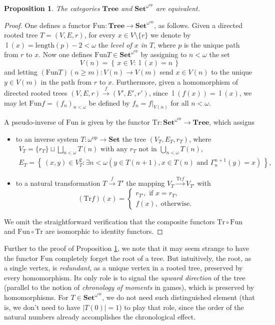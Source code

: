 \documentclass[12pt]{amsart}
\newtheorem{prop}[thm]{Proposition}
\theoremstyle{definition}
\newcommand{\set}[1]{\left\{\, {#1} \,\right\}}
\DeclareMathOperator{\level}{l}
\newcommand{\Sets}{\mathbf{Set}}
\newcommand{\Tree}{\mathbf{Tree}}
\newcommand{\SetNop}{\Sets^{\omega^{\op}}}
\newcommand{\op}{\mathrm{op}}
\begin{document}
\begin{prop}\label{THM_Tree_SetNop}
	The categories $\Tree$ and $\SetNop$ are equivalent.
\end{prop}
\begin{proof}
	One defines a functor $\mathrm{Fun}\colon \Tree \to \SetNop$, as follows. Given a directed rooted tree $T=(V,E,r)$, for every $x\in V\setminus\{r\}$ we denote by $\level(x) = \mathrm{length}(p)-2<\omega$ the \textit{level of $x$ in $T$}, where $p$ is the unique path from $r$ to $x$. 
	Now one defines $\mathrm{Fun}T\in \SetNop$  by assigning to $n<\omega$ the set
	\[		
	V(n) = \set{x\in V: \level(x)=n}
	\]
	and  letting $(\mathrm{Fun}T)(n\ge m)\colon V(n) \to V(m)$ send $x\in V(n)$ to the unique $y\in V(m)$ in the path from $r$ to $x$. 
	Furthermore, given a homomorphism of directed rooted trees $(V,E,r)\stackrel{f}{\to}(V',E',r')$, since $\level(f(x))=\level(x)$, we may let $\mathrm{Fun}f = (f_n)_{n<\omega}$ be defined by $f_n=f|_{V(n)}$ for all $n<\omega$.
	
	A pseudo-inverse of $\mathrm{Fun}$ is given by the functor
	$\mathrm{Tr}\colon \SetNop \to \Tree$, which assigns
	\begin{itemize}
		\item to an inverse system $T\colon \omega^{\op} \to \Sets$ the tree $(V_T,E_T,r_T)$, where 
		\begin{gather*}
			V_T=\{r_T\} \sqcup\bigsqcup_{n<\omega}T(n) \text{ with any } r_T \text{ not in } \bigcup_{n<\omega}T(n),\\  
			E_T=\set{(x,y)\in V_T^2: \exists n<\omega (y\in T(n+1),  x\in T(n) \text{ and } \Gamma^{n+1}_n(y)=x)},
		\end{gather*}
		\item to a natural transformation $T\stackrel{f}{\to} T'$ the mapping $V_T\stackrel{\mathrm{Tr}f}{\to} V_{T'}$ with
		\[
		(\mathrm{Tr}f)(x) = \begin{cases}
			r_{T'}, \text{ if $x = r_T$,}\\
			f(x), \text{ otherwise.}
		\end{cases}
		\]
	\end{itemize}
	We omit the straightforward verification that the composite functors $\mathrm{Tr}\circ\mathrm{Fun}$ and $\mathrm{Fun}\circ\mathrm{Tr}$ are isomorphic to identity functors.
\end{proof}


Further to the proof of Proposition  \ref{THM_Tree_SetNop}, we note that it may seem strange to have the functor $\mathrm{Fun}$ completely forget the root of a tree. 
But
intuitively, the root, as a single vertex, is \textit{redundant}, as a unique vertex in a rooted tree, preserved by every homomorphism. Its only role is to signal the \textit{upward direction} of the tree (parallel to the notion of \textit{chronology of moments} in games), which is preserved by homomorphisms. For  $T\in\SetNop$, we do not need such distinguished element (that is, we don't need to have $|T(0)|=1$) to play that role, since the order of the natural numbers already accomplishes the chronological effect.
\end{document}
